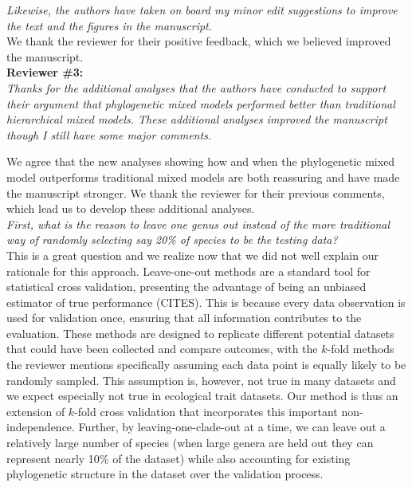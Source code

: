 \documentclass[11pt]{article}
\begin{document}
\emph{Likewise, the authors have taken on board my minor edit suggestions to improve the text and the figures in the manuscript.}\\

We thank the reviewer for their positive feedback, which we believed improved the manuscript.\\ %

{\bf Reviewer \#3:}\\ 


\emph{Thanks for the additional analyses that the authors have conducted to support their argument that phylogenetic mixed models performed better than traditional hierarchical mixed models. These additional analyses improved the manuscript though I still have some major comments.}

We agree that the new analyses showing how and when the phylogenetic mixed model outperforms traditional mixed models are both reassuring and have made the manuscript stronger. We thank the reviewer for their previous comments, which lead us to develop these additional analyses. \\


\emph{First, what is the reason to leave one genus out instead of the more traditional way of randomly selecting say 20\% of species to be the testing data? }\\

This is a great question and we realize now that we did not well explain our rationale for this approach. Leave-one-out methods are a standard tool for statistical cross validation, presenting the advantage of being an unbiased estimator of true performance (CITES). This is because every data observation is used for validation once, ensuring that all information contributes to the evaluation. These methods are designed to replicate different potential datasets that could have been collected and compare outcomes, with the $k$-fold methods the reviewer mentions specifically assuming each data point is equally likely to be randomly sampled. This assumption is, however, not true in many datasets and we expect especially not true in ecological trait datasets. Our method is thus an extension of  $k$-fold cross validation that incorporates this important non-independence. Further, by leaving-one-clade-out at a time, we can leave out a relatively large number of species (when large genera are held out they can represent nearly 10\% of the dataset) while also accounting for existing phylogenetic structure in the dataset over the validation process.
\end{document}
